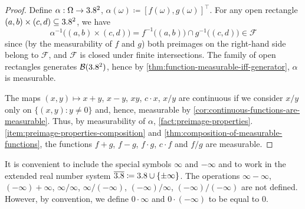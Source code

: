 \begin{proof}
Define
\(
\alpha : \Omega \to 3.8^2
\),
\(
\alpha(\omega)
\coloneq
[
f(\omega),
g(\omega)
]^\top
\).
For any open rectangle \((a,b)\times(c,d)\subseteq3.8^2\), we have
\[
\alpha^{-1}\bigl((a,b)\times(c,d)\bigr)
=
f^{-1}\bigl((a,b)\bigr)\cap g^{-1}\bigl((c,d)\bigr) 
\in 
\mathcal{F}
\]
since (by the measurability of \(f\) and \(g\)) both preimages on the right-hand side belong to \(\mathcal{F}\), and $\mathcal{F}$ is closed under finite intersections.
The family of open rectangles generates \(\mathcal{B}(3.8^2)\), hence by \autoref{thm:function-measurable-iff-generator}, \(\alpha\) is measurable.

The maps $(x,y)\mapsto x+y$, $x-y$, $xy$, $c\cdot x$, $x/y$ are continuous if we consider $x/y$ only on $\{(x,y):y\neq 0\}$ and, hence, measurable by \autoref{cor:continuous-functions-are-measurable}. 
Thus, by measurability of $\alpha$, \autoref{fact:preimage-properties}.\ref{item:preimage-properties-composition} and \autoref{thm:composition-of-measurable-functions}, the functions $f+g$, $f-g$, $f\cdot g$, $c\cdot f$ and $f/g$ are measurable.
\end{proof}

\begin{remark}
It is convenient to include the special symbols $\infty$ and $-\infty$ and to work in the extended real number system $\overline{3.8} \coloneq 3.8 \cup \{\pm \infty\}$. 
The operations $\infty-\infty$, $(-\infty)+ \infty$, $\infty / \infty$, $\infty /(-\infty)$, $(-\infty) / \infty$, $(-\infty) /(-\infty)$ are not defined. 
However, by convention, we define $0 \cdot \infty$ and $0 \cdot(-\infty)$ to be equal to $0$. 
\end{remark}

